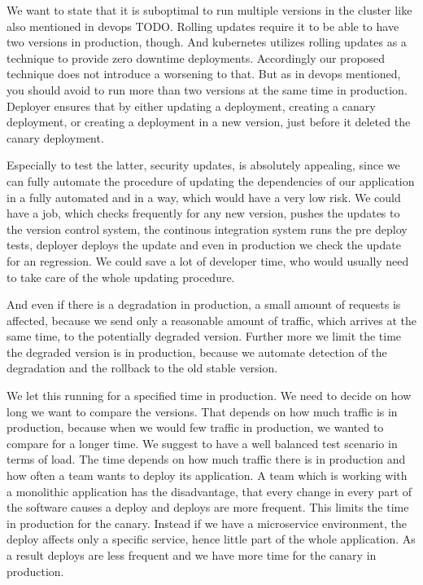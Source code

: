 We want to state that it is suboptimal to run multiple versions in the cluster like also
mentioned in devops TODO. Rolling updates require it to be able to have two versions in
production, though. And kubernetes utilizes rolling updates as a technique to provide zero
downtime deployments. Accordingly our proposed technique does not introduce a worsening to
that. But as in devops mentioned, you should avoid to run more than two versions at the
same time in production. Deployer ensures that by either updating a deployment, creating a
canary deployment, or creating a deployment in a new version, just before it deleted the
canary deployment.

Especially to test the latter, security updates, is absolutely appealing, since we can
fully automate the procedure of updating the dependencies of our application in a fully
automated and in a way, which would have a very low risk. We could have a job, which
checks frequently for any new version, pushes the updates to the version control system,
the continous integration system runs the pre deploy tests, deployer deploys the update
and even in production we check the update for an regression. We could save a lot of
developer time, who would usually need to take care of the whole updating procedure.

And even if there is a degradation in production, a small amount of requests is affected,
because we send only a reasonable amount of traffic, which arrives at the same time, to
the potentially degraded version. Further more we limit the time the degraded version is
in production, because we automate detection of the degradation and the rollback to the
old stable version.


We let this running for a specified time in production. We need to decide on how long we
want to compare the versions. That depends on how much traffic is in production, because
when we would few traffic in production, we wanted to compare for a longer time. We
suggest to have a well balanced test scenario in terms of load. The time depends on how
much traffic there is in production and how often a team wants to deploy its
application. A team which is working with a monolithic application has the disadvantage,
that every change in every part of the software causes a deploy and deploys are more
frequent. This limits the time in production for the canary. Instead if we have a
microservice environment, the deploy affects only a specific service, hence little part of
the whole application. As a result deploys are less frequent and we have more time for the
canary in production.

